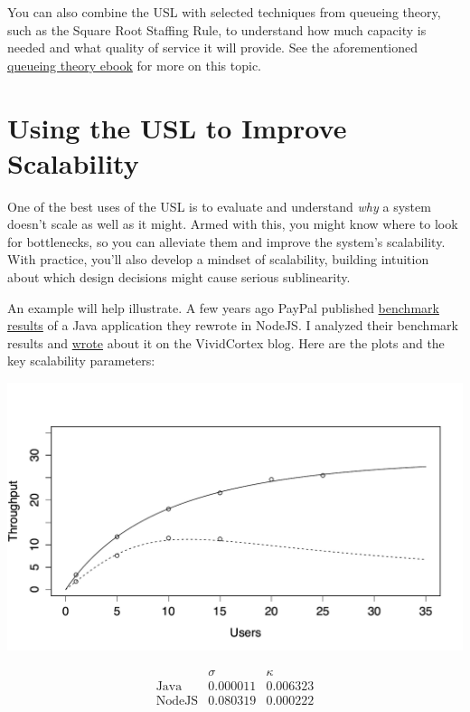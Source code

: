 \documentclass{vivid_layout}
\begin{document}
You can also combine the USL with selected techniques from queueing theory, such
as the Square Root Staffing Rule, to understand how much capacity is needed and
what quality of service it will provide. See the aforementioned
\href{https://www.vividcortex.com/resources/queueing-theory/}{queueing theory
ebook} for more on this topic.

\section{Using the USL to Improve Scalability}

One of the best uses of the USL is to evaluate and understand {\itshape why} a
system doesn't scale as well as it might. Armed with this, you might know where
to look for bottlenecks, so you can alleviate them and improve the system's
scalability. With practice, you'll also develop a mindset of scalability,
building intuition about which design decisions might cause serious
sublinearity.

An example will help illustrate. A few years ago PayPal published
\href{https://www.paypal-engineering.com/2013/11/22/node-js-at-paypal/}{benchmark
results} of a Java application they rewrote in NodeJS. I analyzed their
benchmark results and
\href{https://www.vividcortex.com/blog/2013/12/09/analysis-of-paypals-node-vs-java-benchmarks/}{wrote} about it on the VividCortex blog.
Here are the plots and the key scalability parameters:
\begin{center}
\includegraphics[width=.85\linewidth]{scalability/paypal}
\end{center}
\[
\begin{array}{lcc}
& \sigma & \kappa \\
\mbox{Java} & 0.000011 & 0.006323 \\
\mbox{NodeJS} &  0.080319 & 0.000222 \\
\end{array}
\]
\end{document}
